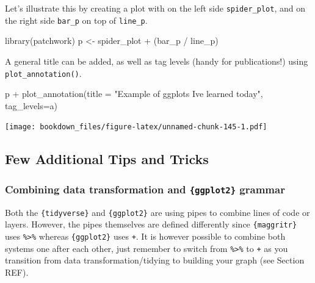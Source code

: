 \documentclass[
]{krantz}
\makeatletter
\newenvironment{Shaded}{\begin{snugshade}}{\end{snugshade}}
\newcommand{\AttributeTok}[1]{\textcolor[rgb]{0.61,0.61,0.61}{#1}}
\newcommand{\FunctionTok}[1]{\textcolor[rgb]{0,0,0}{#1}}
\newcommand{\NormalTok}[1]{#1}
\newcommand{\OtherTok}[1]{\textcolor[rgb]{0.37,0.37,0.37}{#1}}
\newcommand{\SpecialCharTok}[1]{\textcolor[rgb]{0,0,0}{#1}}
\newcommand{\StringTok}[1]{\textcolor[rgb]{0.5,0.5,0.5}{#1}}
\newenvironment{kframe}{%
\medskip{}
\setlength{\fboxsep}{.8em}
 \def\at@end@of@kframe{}%
 \ifinner\ifhmode%
  \def\at@end@of@kframe{\end{minipage}}%
  \begin{minipage}{\columnwidth}%
 \fi\fi%
 \def\FrameCommand##1{\hskip\@totalleftmargin \hskip-\fboxsep
 \colorbox{shadecolor}{##1}\hskip-\fboxsep
     \hskip-\linewidth \hskip-\@totalleftmargin \hskip\columnwidth}%
 \MakeFramed {\advance\hsize-\width
   \@totalleftmargin\z@ \linewidth\hsize
   \@setminipage}}%
 {\par\unskip\endMakeFramed%
 \at@end@of@kframe}
\renewenvironment{Shaded}{\begin{kframe}}{\end{kframe}}
\makeatother
\begin{document}
Let's illustrate this by creating a plot with on the left side \texttt{spider\_plot}, and on the right side \texttt{bar\_p} on top of \texttt{line\_p}.

\begin{Shaded}
\begin{Highlighting}[]
\FunctionTok{library}\NormalTok{(patchwork)}
\NormalTok{p }\OtherTok{\textless{}{-}}\NormalTok{ spider\_plot }\SpecialCharTok{+}\NormalTok{ (bar\_p }\SpecialCharTok{/}\NormalTok{ line\_p)}
\end{Highlighting}
\end{Shaded}

A general title can be added, as well as tag levels (handy for publications!) using \texttt{plot\_annotation()}.

\begin{Shaded}
\begin{Highlighting}[]
\NormalTok{p }\SpecialCharTok{+} \FunctionTok{plot\_annotation}\NormalTok{(}\AttributeTok{title =} \StringTok{"Example of \textquotesingle{}ggplots\textquotesingle{} I\textquotesingle{}ve learned today"}\NormalTok{, }
                    \AttributeTok{tag\_levels=}\StringTok{\textquotesingle{}a\textquotesingle{}}\NormalTok{)}
\end{Highlighting}
\end{Shaded}

\texttt{[image: bookdown\_files/figure-latex/unnamed-chunk-145-1.pdf]}

\hypertarget{tipsntricks}{%
\subsection{Few Additional Tips and Tricks}\label{tipsntricks}}

\hypertarget{combining-data-transformation-and-ggplot2-grammar}{%
\subsubsection{\texorpdfstring{Combining data transformation and \texttt{\{ggplot2\}} grammar}{Combining data transformation and \{ggplot2\} grammar}}\label{combining-data-transformation-and-ggplot2-grammar}}

Both the \texttt{\{tidyverse\}} and \texttt{\{ggplot2\}} are using pipes to combine lines of code or layers.
However, the pipes themselves are defined differently since \texttt{\{maggritr\}} uses \texttt{\%\textgreater{}\%} whereas \texttt{\{ggplot2\}} uses \texttt{+}.
It is however possible to combine both systems one after each other, just remember to switch from \texttt{\%\textgreater{}\%} to \texttt{+} as you transition from data transformation/tidying to building your graph (see Section REF).
\end{document}
